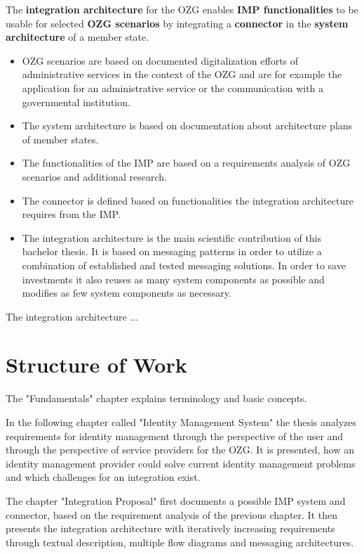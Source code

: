 \documentclass[
     12pt,         %
     a4paper,      %
     BCOR=10mm,version=first,     %
     DIV=14,version=first,        %
     ]{scrreprt}
\begin{document}
The \textbf{integration architecture} for the OZG enables \textbf{IMP functionalities} to be usable for selected \textbf{OZG scenarios} by integrating a \textbf{connector} in the \textbf{system architecture} of a member state.

\begin{itemize}
    \item OZG scenarios are based on documented digitalization efforts of administrative services in the context of the OZG and are for example the application for an administrative service or the communication with a governmental institution.
    \item The system architecture is based on documentation about architecture plans of member states.
    \item The functionalities of the IMP are based on a requirements analysis of OZG scenarios and additional research.
    \item The connector is defined based on functionalities the integration architecture requires from the IMP.
    \item The integration architecture is the main scientific contribution of this bachelor thesis. It is based on messaging patterns in order to utilize a combination of established and tested messaging solutions. In order to save investments it also reuses as many system components as possible and modifies as few system components as necessary.
\end{itemize}

The integration architecture ...

\section{Structure of Work}
The "Fundamentals" chapter explains terminology and basic concepts.

In the following chapter called "Identity Management System" the thesis analyzes requirements for identity management through the perspective of the user and through the perspective of service providers for the OZG. It is presented, how an identity management provider could solve current identity management problems and which challenges for an integration exist.

The chapter "Integration Proposal" first documents a possible IMP system and connector, based on the requirement analysis of the previous chapter. It then presents the integration architecture with iteratively increasing requirements through textual description, multiple flow diagrams and messaging architectures.
\end{document}
